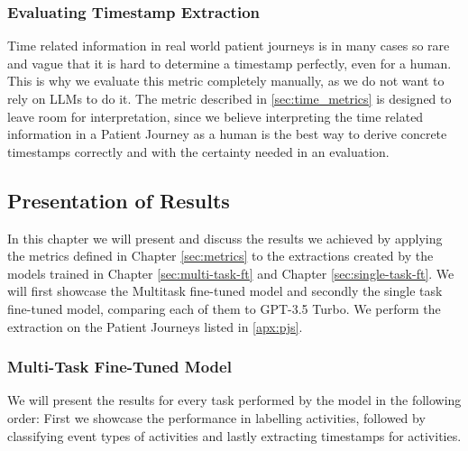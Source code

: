 \subsubsection{Evaluating Timestamp Extraction}\label{sec:eval_time}
Time related information in real world patient journeys is in many cases so rare and vague that it is hard to determine a timestamp perfectly, even for a human. This is why we evaluate this metric completely manually, as we do not want to rely on LLMs to do it. The metric described in \ref{sec:time_metrics} is designed to leave room for interpretation, since we believe interpreting the time related information in a Patient Journey as a human is the best way to derive concrete timestamps correctly and with the certainty needed in an evaluation.

\subsection{Presentation of Results}\label{sec:results}
In this chapter we will present and discuss the results we achieved by applying the metrics defined in Chapter \ref{sec:metrics} to the extractions created by the models trained in Chapter \ref{sec:multi-task-ft} and Chapter \ref{sec:single-task-ft}.
We will first showcase the Multitask fine-tuned model and secondly the single task fine-tuned model, comparing each of them to GPT-3.5 Turbo. We perform the extraction on the Patient Journeys listed in \ref{apx:pjs}.

\subsubsection{Multi-Task Fine-Tuned Model}\label{sec_eval_multi}
We will present the results for every task performed by the model in the following order: First we showcase the performance in labelling activities, followed by classifying event types of activities and lastly extracting timestamps for activities.

